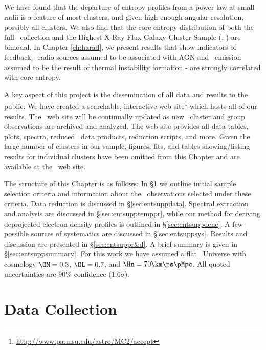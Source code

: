 We have found that the departure of entropy profiles from a power-law
at small radii is a feature of most clusters, and given high enough
angular resolution, possibly all clusters. We also find that the core
entropy distribution of both the full \accept\ collection and the
Highest X-Ray Flux Galaxy Cluster Sample (\hifl, \citealt{hiflugcs1,
  hiflugcs2}) are bimodal. In Chapter \ref{ch:harad}, we present
results that show indicators of feedback - radio sources assumed to be
associated with AGN and \halpha\ emission assumed to be the result of
thermal instability formation - are strongly correlated with core
entropy.

A key aspect of this project is the dissemination of all data and
results to the public. We have created a searchable, interactive web
site\footnote{\url{http://www.pa.msu.edu/astro/MC2/accept}} which
hosts all of our results. The \accept\ web site will be continually
updated as new \chandra\ cluster and group observations are archived
and analyzed. The web site provides all data tables, plots, spectra,
reduced \chandra\ data products, reduction scripts, and more. Given
the large number of clusters in our sample, figures, fits, and tables
showing/listing results for individual clusters have been omitted from
this Chapter and are available at the \accept\ web site.

The structure of this Chapter is as follows: In \S\ref{sec:entsuppsample} we
outline initial sample selection criteria and information about the
\chandra\ observations selected under these criteria. Data reduction
is discussed in \S\ref{sec:entsuppdata}. Spectral extraction and analysis are
discussed in \S\ref{sec:entsupptemppr}, while our method for deriving
deprojected electron density profiles is outlined in
\S\ref{sec:entsuppdene}. A few possible sources of systematics are discussed
in \S\ref{sec:entsuppsys}. Results and discussion are presented in
\S\ref{sec:entsuppr&d}. A brief summary is given in \S\ref{sec:entsuppsummary}. For
this work we have assumed a flat \LCDM\ Universe with cosmology
$\OM=0.3$, $\OL=0.7$, and $\Hn=70\km\ps\pMpc$. All quoted
uncertainties are 90\% confidence ($1.6\sigma$).

\section{Data Collection}
\label{sec:entsuppsample}

